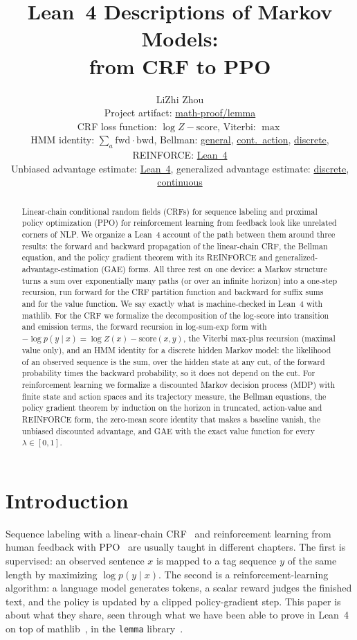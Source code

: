 \documentclass[11pt,a4paper]{article}
\title{Lean~4 Descriptions of Markov Models:\\ from CRF to PPO}
\author{LiZhi Zhou\\[0.3em]
\small Project artifact: \href{https://github.com/math-proof/lemma}{math-proof/lemma}\\[0.4em]
\small
CRF loss function:
\href{http://www.lemma.cn/lean/?module=Random.All_Eq_AddLogSumExpAdd.All_EqNegLogProb.of.All_Eq_LogProbCond.All_Eq_LogProbCond.Eq_LogProbJoint.All_Lt0ProbJoint.IsDiscreteHMM}{$\log Z-\text{score}$},
\quad
Viterbi:
\href{http://www.lemma.cn/lean/?module=Random.All_Eq_Add_MaxAdd.EqMax_ProbJoint.of.All_Eq_LogProbCond.All_Eq_LogProbCond.Eq_LogProbJoint.All_Lt0ProbJoint.IsDiscreteHMM}{$\max$}\\[0.25em]
HMM identity:
\href{http://www.lemma.cn/lean/?module=Random.Sum_Mul_ProbCond.eq.Prob.of.IsDiscreteHMM}{$\sum_a\text{fwd}\cdot\text{bwd}$},
\quad
Bellman:
\href{http://www.lemma.cn/lean/?module=Random.MEq_Expect.MEq_Expect.MEq_Expect.of.All_MEq_Expect.All_MEq_Expect.CondIndep_Joint.GtInftySup.All_MeasurableJoint.In_Ico}{general},
\href{http://www.lemma.cn/lean/?module=Random.Eq_Expect.Eq_Expect.MEq_Expect.of.All_Eq_Expect.All_MEq_Expect.CondIndep.All_Measurable.GtInftySup.All_MeasurableJoint.In_Ico}{cont.\ action},
\href{http://www.lemma.cn/lean/?module=Random.Eq_Expect.Eq_Expect.Eq_Expect.of.All_Eq_Expect.All_Eq_Expect.In_Ico}{discrete},
\quad
REINFORCE:
\href{http://www.lemma.cn/lean/?module=Random.GradExpectDotPow_Id.eq.ExpectDot_FunSMul_GradLogProbCond.of.GtInftySup.All_Differentiable_Prob.All_NeProb_0.IsPolicyTrajectory.In_Ico}{Lean~4}\\[0.25em]
Unbiased advantage estimate:
\href{http://www.lemma.cn/lean/?module=Random.GradExpectDotPow_Id.eq.ExpectDot_FunSMul_GradLogProbCond.of.GtInftySup.All_Differentiable_Prob.All_NeProb_0.IsPolicyTrajectory.In_Ico#advantage}{Lean~4},
\quad
generalized advantage estimate:
\href{http://www.lemma.cn/lean/?module=Random.GradExpectDotPow_Id.eq.ExpectDot_FunSMul_GradLogProbCond.of.GtInftySup.All_Differentiable_Prob.All_NeProb_0.IsPolicyTrajectory.In_Icc.In_Ico}{discrete},
\href{http://www.lemma.cn/lean/?module=Random.GradExpectDotPow_Id.eq.ExpectDotFunSMul_GradLogProbCond.of.GtInftySup.Any_And_All_IntegrableMeasureAndGtInftySup.All_Differentiable_Prob.All_NeDens_0.All_Eq_JointDens.AbsContJointAS.AbsContStateMarginal.IsPolicyTrajectory.Subset_Ico}{continuous}}
\date{}
\begin{document}
\maketitle

\begin{abstract}
Linear-chain conditional random fields (CRFs) for sequence labeling and proximal policy optimization (PPO) for reinforcement learning from feedback look like unrelated corners of NLP.
We organize a Lean~4 account of the path between them around three results: the forward and backward propagation of the linear-chain CRF, the Bellman equation, and the policy gradient theorem with its REINFORCE and generalized-advantage-estimation (GAE) forms.
All three rest on one device: a Markov structure turns a sum over exponentially many paths (or over an infinite horizon) into a one-step recursion, run forward for the CRF partition function and backward for suffix sums and for the value function.
We say exactly what is machine-checked in Lean~4 with mathlib.
For the CRF we formalize the decomposition of the log-score into transition and emission terms, the forward recursion in log-sum-exp form with $-\log p(y\mid x)=\log Z(x)-\text{score}(x,y)$, the Viterbi max-plus recursion (maximal value only), and an HMM identity for a discrete hidden Markov model: the likelihood of an observed sequence is the sum, over the hidden state at any cut, of the forward probability times the backward probability, so it does not depend on the cut.
For reinforcement learning we formalize a discounted Markov decision process (MDP) with finite state and action spaces and its trajectory measure, the Bellman equations, the policy gradient theorem by induction on the horizon in truncated, action-value and REINFORCE form, the zero-mean score identity that makes a baseline vanish, the unbiased discounted advantage, and GAE with the exact value function for every $\lambda\in[0,1]$.
\end{abstract}

\section{Introduction}
\label{sec:intro}

Sequence labeling with a linear-chain CRF~\cite{lafferty2001crf,sutton2012crf} and reinforcement learning from human feedback with PPO~\cite{schulman2017ppo,ziegler2019finetuning,ouyang2022instructgpt} are usually taught in different chapters.
The first is supervised: an observed sentence $x$ is mapped to a tag sequence $y$ of the same length by maximizing $\log p(y\mid x)$.
The second is a reinforcement-learning algorithm: a language model generates tokens, a scalar reward judges the finished text, and the policy is updated by a clipped policy-gradient step.
This paper is about what they share, seen through what we have been able to prove in Lean~4~\cite{moura2021lean4} on top of mathlib~\cite{mathlib2020,mathlib}, in the \texttt{lemma} library~\cite{lemma_repo}.
\end{document}

